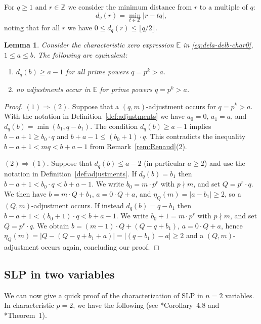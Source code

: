 \documentclass[11pt,reqno]{amsart}
\newcommand{\bb}[1]{\mathbb{#1}}
\newtheorem{lemma}[theorem]{Lemma}
\theoremstyle{definition}
\theoremstyle{remark}
\numberwithin{equation}{section}
\begin{document}
For $q\geq 1$ and $r\in\bb{Z}$ we consider the minimum distance from $r$ to a multiple of $q$:
\begin{equation}\label{eq:def-qdist}
    d_q(r) = \min_{t\in\bb{Z}}|r-tq|,
\end{equation}
noting that for all $r$ we have $0\leq d_q(r)\leq\lfloor q/2\rfloor$.

\begin{lemma}\label{lem:large-q-noadjustment}
    Consider the characteristic zero expression $\bb{E}$ in \eqref{eq:dela-delb-char0}, $1\leq a\leq b$. The following are equivalent:
    \begin{enumerate}
        \item $d_q(b) \geq a-1$ for all prime powers $q=p^k>a$.
        \item no adjustments occur in $\bb{E}$ for prime powers $q=p^k>a$.
    \end{enumerate}
\end{lemma}

\begin{proof}
    $(1) \Rightarrow (2).$ Suppose that a $(q,m)$-adjustment occurs for $q=p^k>a$. With the notation in Definition~\ref{def:adjustments} we have $a_0=0$, $a_1=a$, and $d_q(b)=\min(b_1,q-b_1)$. The condition $d_q(b)\geq a-1$ implies $b-a+1\geq b_0\cdot q$ and $b+a-1\leq(b_0+1)\cdot q$. This contradicts the inequality $b-a+1<mq<b+a-1$ from Remark~\ref{rem:Renaud}(2).

\noindent $(2) \Rightarrow (1).$ Suppose that $d_q(b)\leq a-2$ (in particular $a\geq 2$) and use the notation in Definition~\ref{def:adjustments}. If $d_q(b)=b_1$ then $b-a+1<b_0\cdot q<b+a-1$. We write $b_0 = m\cdot p^r$ with $p\nmid m$, and set $Q = p^r\cdot q$. We then have $b = m\cdot Q + b_1$, $a=0\cdot Q + a$, and $\eta_Q(m)=|a-b_1|\geq 2$, so a $(Q,m)$-adjustment occurs. If instead $d_q(b)=q-b_1$ then $b-a+1<(b_0+1)\cdot q<b+a-1$. We write $b_0+1 = m\cdot p^r$ with $p\nmid m$, and set $Q = p^r\cdot q$. We obtain $b = (m-1)\cdot Q + (Q-q+b_1)$, $a=0\cdot Q+a$, hence $\eta_Q(m)=|Q-(Q-q+b_1+a)|=|(q-b_1)-a|\geq 2$ and a $(Q,m)$-adjustment occurs again, concluding our proof.
\end{proof}

\subsection{SLP in two variables}
\label{subsec:SLP-2vars}
We can now give a quick proof of the characterization of SLP in $n=2$ variables. In characteristic $p=2$, we have the following (see \cite{Cook12}*{Corollary~4.8} and \cite{StandardJordan}*{Theorem~1}). 
\end{document}
